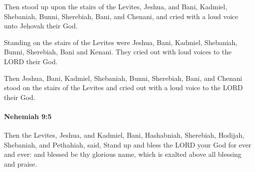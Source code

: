 			\begin{versebox}
					\item[BHS] 
					\item[LXX] 
					\item[ASV] Then stood up upon the stairs of the Levites, Jeshua, and Bani, Kadmiel, Shebaniah, Bunni, Sherebiah, Bani, and Chenani, and cried with a loud voice unto Jehovah their God.
					\item[NIV] Standing on the stairs of the Levites were Jeshua, Bani, Kadmiel, Shebaniah, Bunni, Sherebiah, Bani and Kenani. They cried out with loud voices to the LORD their God.
					\item[NRSV] Then Jeshua, Bani, Kadmiel, Shebaniah, Bunni, Sherebiah, Bani, and Chenani stood on the stairs of the Levites and cried out with a loud voice to the LORD their God.
			\end{versebox}

		\paragraph{Nehemiah 9:5} %
			\label{NEHEMIAH-9-5}

			Then the Levites, Jeshua, and Kadmiel, Bani, Hashabniah, Sherebiah, Hodijah, Shebaniah, and Pethahiah, said, Stand up and bless the LORD your God for ever and ever: and blessed be thy glorious name, which is exalted above all blessing and praise.

